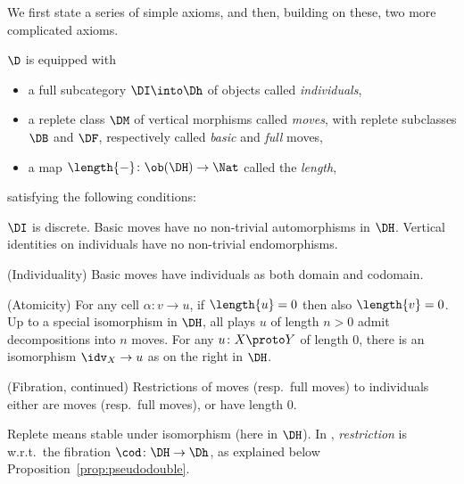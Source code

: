 \documentclass{LMCS}
\theoremstyle{plain}\newtheorem{satz}[thm]{Satz}
\begin{document}
We first state a series of simple axioms, and then, building on these,
two more complicated axioms.
\begin{ax}\label{ax:indivmoves}
  $\D$ is equipped with
  \begin{itemize}
  \item a full subcategory $\DI \into \Dh$ of objects called
    \emph{individuals},
  \item a replete class $\DM$ of vertical morphisms called \emph{moves},
    with replete subclasses $\DB$ and $\DF$, respectively called
    \emph{basic} and \emph{full} moves,
  \item a map $\length{-} \colon \ob(\DH) \to \Nat$ called the \emph{length},
  \end{itemize}
  satisfying the following conditions:
  \begin{axioms}
  \item $\DI$ is discrete. Basic moves have no non-trivial
    automorphisms in $\DH$.  Vertical identities on individuals have
    no non-trivial endomorphisms.
    \label{discreteness}
  \item (Individuality) Basic moves have individuals as both domain
    and codomain. \label{individuality}
  \item
    \begin{minipage}[t]{.97\linewidth}
      \vspace*{-.82em}
      \begin{wrapfigure}{r}{0pt}
        \begin{minipage}[t]{.18\linewidth}
          \vspace*{-1.5em} 
        \end{minipage}
      \end{wrapfigure}
      (Atomicity) For any cell $\alpha \colon v \to u$, if $\length{u}
      = 0$ then also $\length{v} = 0$.  Up to a special isomorphism in
      $\DH$, all plays $u$ of length $n > 0$ admit decompositions into
      $n$ moves.  For any $u \colon X \proto Y$ of length 0, there is
      an isomorphism $\idv_X \to u$ as on the right in $\DH$.
    \end{minipage}
\label{atomicity}
\item (Fibration, continued) Restrictions of moves (resp.\ full moves)
  to individuals either are moves (resp.\ full moves), or have length
  0. \label{fibration:continued}
  \end{axioms}
\end{ax}
Replete means stable under isomorphism (here in $\DH$).  In
, \emph{restriction} is w.r.t.\ the
fibration $\cod \colon \DH \to \Dh$, as explained below
Proposition~\ref{prop:pseudodouble}. 
\end{document}
